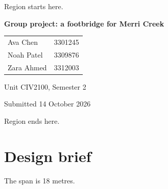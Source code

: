 \documentclass[11pt]{report}
\begin{document}
Region starts here.

\begin{titlepage}
\centering
\vspace*{20mm}
{\LARGE\bfseries Group project: a footbridge for Merri Creek\par}
\vspace{15mm}
\begin{tabular}{ll}
Ava Chen & 3301245 \\
Noah Patel & 3309876 \\
Zara Ahmed & 3312003 \\
\end{tabular}
\par\vspace{15mm}
{\large Unit CIV2100, Semester 2\par}
\vfill
Submitted 14 October 2026
\end{titlepage}

Region ends here.

\chapter{Design brief}
The span is 18 metres.
\end{document}
